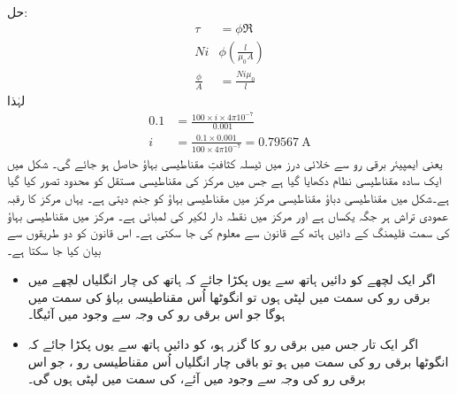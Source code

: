 حل:
\begin{align*}
\tau&=\phi \Re\\
N i & \phi \left(\frac{l}{\mu_0 A} \right)\\
\frac{\phi}{A}&=\frac{ N i \mu_0}{l}
\end{align*}
لہٰذا
\begin{align*}
0.1&=\frac{100 \times i \times 4 \pi  10^{-7}}{0.001}\\
i&=\frac{0.1 \times 0.001}{100 \times 4 \pi  10^{-7}}=\SI{0.79567}{\ampere}
\end{align*}
یعنی  ایمپیئر برقی رو سے خلائی درز میں  ٹیسلہ کثافتِ مقناطیسی بہاؤ حاصل ہو جائے گی۔
%
شکل  میں ایک سادہ مقناطیسی نظام دکھایا گیا ہے جس میں مرکز کی مقناطیسی مستقل کو محدود تصور کیا گیا ہے۔شکل میں مقناطیسی دباؤ   مقناطیسی مرکز میں مقناطیسی بہاؤ  کو جنم دیتی ہے۔ یہاں مرکز کا رقبہ عمودی تراش   ہر جگہ یکساں ہے اور مرکز میں  نقطہ دار لکیر کی لمبائی  ہے۔ مرکز میں مقناطیسی بہاؤ  کی سمت فلیمنگ کے دائیں ہاتھ کے قانون  سے معلوم کی جا سکتی ہے۔  اس قانون کو دو طریقوں سے بیان کیا جا سکتا ہے۔
\begin{itemize}
\item
اگر ایک لچھے کو دائیں ہاتھ سے یوں پکڑا  جائے کہ ہاتھ کی چار انگلیاں لچھے میں برقی رو کی سمت میں لپٹی  ہوں تو انگوٹھا اُس مقناطیسی بہاؤ کی سمت میں ہوگا جو اس برقی رو کی وجہ سے وجود میں آئیگا۔
\item
اگر ایک تار جس میں برقی رو کا گزر ہو، کو دائیں ہاتھ سے یوں پکڑا جائے کہ انگوٹھا  برقی رو  کی سمت میں ہو تو باقی چار انگلیاں اُس مقناطیسی  رو ، جو اس برقی رو کی وجہ سے وجود میں آئے،  کی سمت میں لپٹی ہوں گی۔
\end{itemize}

